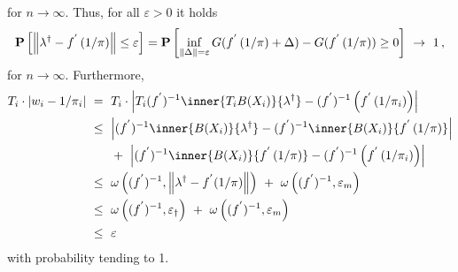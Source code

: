  for $ n \to \infty $.
 Thus, for all $ \varepsilon > 0 $
 it holds
 \begin{gather*}
   \P
   \left[ 
     \norm
     {
      \lambda ^ \dagger
      -
      f ^ { ' }
      \left( 
        1 / \pi 
      \right)
     }
     \le
     \varepsilon
   \right]
   =
   \P
   \left[ 
     \inf _ { \norm{\Delta} = \varepsilon }
     G
     (
      f ^ { ' }
      \left( 
        1 / \pi 
      \right)
      +
      \Delta
     )
     -
     G
     (
      f ^ { ' }
      \left( 
        1 / \pi 
      \right)
     )
     \ge 
     0
   \right]
   \ 
   \to 
   \ 
   1
   \,,
 \end{gather*}
 for $ n \to \infty $.
 Furthermore,
 \begin{align*}
   T_i
   \cdot
   \left| 
   w_i
   -
   1 / \pi_i
   \right|
   & 
   \ 
   =
   \ 
   T_i
   \cdot
   \left| 
   T_i
   (
      f ^ { ' }
   )
   ^ {-1}
   \inner
   {T_i B(X_i)}
   { \lambda ^ \dagger }
   -
     (f ^ { ' }) ^ { -1 }
     \left( 
      f ^ { ' }
      \left( 
        1 / \pi _ i
      \right)
     \right)
   \right|
   \\
   & 
   \ 
   \le
   \ 
   \left| 
   (
      f ^ { ' }
   )
   ^ {-1}
   \inner
   {B(X_i)}
   { \lambda ^ \dagger }
   -
   (
      f ^ { ' }
   )
   ^ {-1}
          \inner
          {B(X_i)}
          {
      f ^ { ' }
      \left( 
        1 / \pi 
      \right)
          }
   \right|
   \\
   &
   \qquad
   +
   \ 
   \left| 
   (
      f ^ { ' }
   )
   ^ {-1}
          \inner
          {B(X_i)}
          {
      f ^ { ' }
      \left( 
        1 / \pi 
      \right)
          }
   -
     (f ^ { ' }) ^ { -1 }
     \left( 
      f ^ { ' }
      \left( 
        1 / \pi _ i
      \right)
     \right)
   \right|
   \\
   &
   \ 
   \le
   \ 
   \omega
   \left( 
     (f ^ { ' }) ^ { -1 }
     ,
     \norm{ \lambda ^ \dagger - f ^ {'} (1/\pi) }
   \right)
   \ 
   +
   \ 
   \omega
   \left( 
     (f ^ { ' }) ^ { -1 }
     ,
     \varepsilon _ m
   \right)
   \\
   &
   \ 
   \le
   \ 
   \omega
   \left( 
     (f ^ { ' }) ^ { -1 }
     ,
     \varepsilon _ \dagger
   \right)
   \ 
   +
   \ 
   \omega
   \left( 
     (f ^ { ' }) ^ { -1 }
     ,
     \varepsilon _ m
   \right)
   \\
   &
   \ 
   \le
   \ 
   \varepsilon
 \end{align*}
 with probability tending to 1.

